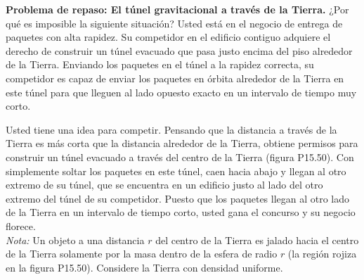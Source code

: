 \item \textbf{Problema de repaso: El túnel gravitacional a través de la Tierra.}
¿Por qué es imposible la siguiente situación? Usted está en el negocio de entrega de paquetes con alta rapidez. Su competidor en el edificio contiguo adquiere el derecho de construir un túnel evacuado que pasa justo encima del piso alrededor de la Tierra. Enviando los paquetes en el túnel a la rapidez correcta, su competidor es capaz de enviar los paquetes en órbita alrededor de la Tierra en este túnel para que lleguen al lado opuesto exacto en un intervalo de tiempo muy corto.

Usted tiene una idea para competir. Pensando que la distancia a través de la Tierra es más corta que la distancia alrededor de la Tierra, obtiene permisos para construir un túnel evacuado a través del centro de la Tierra (figura P15.50). Con simplemente soltar los paquetes en este túnel, caen hacia abajo y llegan al otro extremo de su túnel, que se encuentra en un edificio justo al lado del otro extremo del túnel de su competidor. Puesto que los paquetes llegan al otro lado de la Tierra en un intervalo de tiempo corto, usted gana el concurso y su negocio florece. \\
\textit{Nota:} Un objeto a una distancia $r$ del centro de la Tierra es jalado hacia el centro de la Tierra solamente por la masa dentro de la esfera de radio $r$ (la región rojiza en la figura P15.50). Considere la Tierra con densidad uniforme.